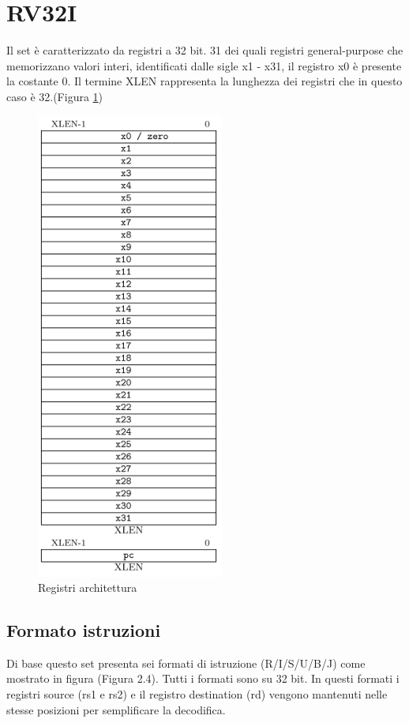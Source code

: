 \documentclass[12pt,a4paper]{report}
\begin{document}
\section{RV32I}
Il set è caratterizzato da registri a 32 bit. 31 dei quali registri general-purpose che memorizzano valori interi, identificati dalle sigle x1 - x31, il registro x0 è presente la costante 0.  Il termine XLEN rappresenta la lunghezza dei registri che in questo caso è 32.(Figura \ref{Fig:registri_arc_32})

\begin{figure}
\centering
\includegraphics[scale= 0.7]{RegistriRV.png}
\caption{Registri architettura}
\label{Fig:registri_arc_32}
\end{figure}

\newpage

\subsection{Formato istruzioni }
Di base questo set presenta sei formati di istruzione (R/I/S/U/B/J) come mostrato in figura  (Figura 2.4).
Tutti i formati sono su 32 bit. In questi formati i registri source (rs1 e rs2) e il registro destination (rd) vengono mantenuti nelle stesse posizioni per semplificare la decodifica.
\end{document}
